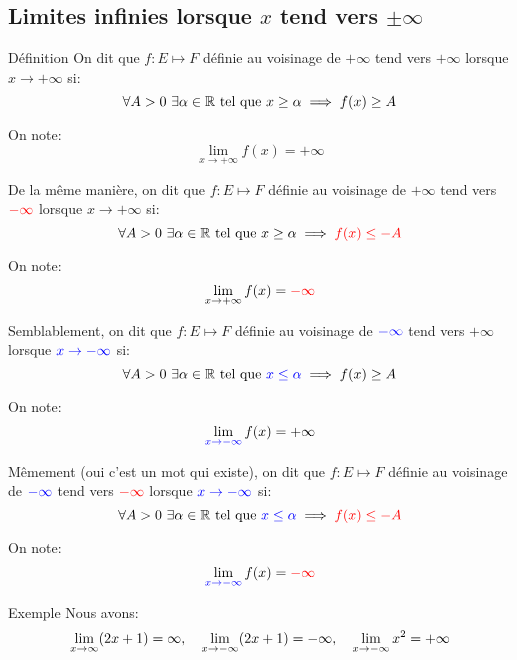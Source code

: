 \documentclass[a4paper]{article}
\begin{document}
\subsection{Limites infinies lorsque $x$ tend vers $\pm\infty$}
\begin{parag}{Définition}
    On dit que $f : E \mapsto F$ définie au voisinage de $+\infty$ tend vers $+\infty$ lorsque $x \to +\infty$ si:
    \[\forall A > 0\ \exists \alpha \in \mathbb{R} \telque x \geq \alpha \implies f\left(x\right) \geq A\]

    On note:
    \[\lim_{x \to +\infty} f\left(x\right) = +\infty\]

    De la même manière, on dit que $f : E \mapsto F$ définie au voisinage de $+\infty$ tend vers ${\color{red}-\infty}$ lorsque $x \to +\infty$ si:
    \[\forall A > 0\ \exists \alpha \in \mathbb{R} \telque x \geq \alpha \implies {\color{red}f\left(x\right) \leq -A}\]

    On note:
    \[\lim_{x \to +\infty} f\left(x\right) = {\color{red}-\infty}\]

    Semblablement, on dit que $f : E \mapsto F$ définie au voisinage de ${\color{blue}-\infty}$ tend vers $+\infty$ lorsque ${\color{blue}x \to -\infty}$ si:
    \[\forall A > 0\ \exists \alpha \in \mathbb{R} \telque {\color{blue}x \leq \alpha} \implies f\left(x\right) \geq A\]

    On note:
    \[\lim_{{\color{blue}x \to -\infty}} f\left(x\right) = +\infty\]

    Mêmement (oui c'est un mot qui existe), on dit que $f : E \mapsto F$ définie au voisinage de ${\color{blue}-\infty}$ tend vers ${\color{red}-\infty}$ lorsque ${\color{blue}x \to -\infty}$ si:
    \[\forall A > 0\ \exists \alpha \in \mathbb{R} \telque {\color{blue}x \leq \alpha} \implies {\color{red}f\left(x\right) \leq -A}\]

    On note:
    \[\lim_{{\color{blue}x \to -\infty}} f\left(x\right) = {\color{red}-\infty}\]
\end{parag}

\begin{parag}{Exemple}
    Nous avons:
    \[\lim_{x \to \infty} \left(2x + 1\right) = \infty, \mathspace \lim_{x \to -\infty} \left(2x + 1\right) = -\infty, \mathspace \lim_{x \to -\infty} x^2 = +\infty\]
\end{parag}
\end{document}
